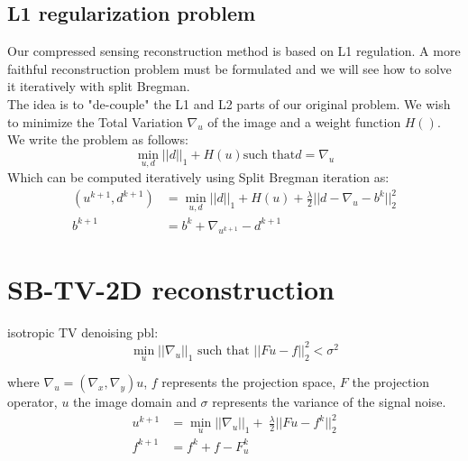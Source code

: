     \subsection{L1 regularization problem}
    Our compressed sensing reconstruction method is based on L1 regulation. A more faithful reconstruction problem must be formulated and we will see how to solve it iteratively with split Bregman.\\
    The idea is to "de-couple" the L1 and L2 parts of our original problem. We wish to minimize the Total Variation $\nabla_u$ of the image and a weight function $H()$. We write the problem as follows:
    \begin{equation}
        \label{Eq:L1Const}
        \min_{u,d}||d||_1 + H(u) \mbox{such that} d = \nabla_u
    \end{equation}
    Which can be computed iteratively using Split Bregman iteration as:
    \begin{equation}
        \begin{aligned}
            (u^{k+1},d^{k+1}) &= \min_{u,d} ||d||_1 + H(u) +     \frac{\lambda}{2}||d - \nabla_u - b^k||^2_2\\
            b^{k+1} &= b^k + \nabla_{u^{k+1}} - d^{k+1}
    \end{aligned}
    \end{equation}
\section{SB-TV-2D reconstruction}
    isotropic TV denoising pbl: 
    \begin{equation}
        \min_{u} ||\nabla_u||_1 \mbox{ such that } ||Fu - f||_2^2 < \sigma^2
    \end{equation}
    
    where $\nabla_u = (\nabla_x,\nabla_y)u$, $f$ represents the projection space, $F$ the projection operator, $u$ the image domain and $\sigma$ represents the variance of the signal noise.
    \begin{equation}
        \begin{aligned}
            u^{k+1} &= \min_{u}||\nabla_u||_1 + \ \frac{\lambda}{2}||Fu - f^k||_2^2\\
            f^{k+1} &= f^k + f - F_u^k
        \end{aligned}
    \end{equation}


